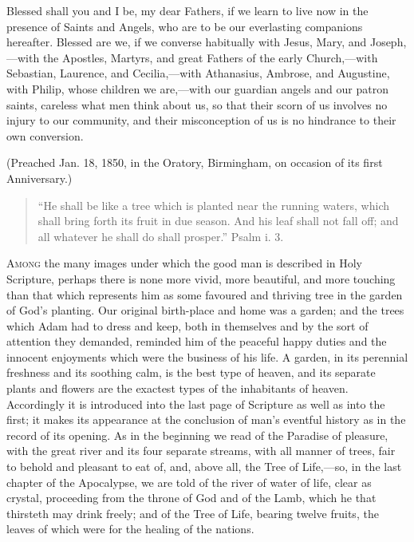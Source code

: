 Blessed shall you and I be, my dear Fathers, if we
learn to live now in the presence of Saints and Angels,
who are to be our everlasting companions hereafter.
Blessed are we, if we converse habitually with Jesus,
Mary, and Joseph,—with the Apostles, Martyrs, and
great Fathers of the early Church,—with Sebastian,
Laurence, and Cecilia,—with Athanasius, Ambrose, and
Augustine, with Philip, whose children we are,—with
our guardian angels and our patron saints, careless what
men think about us, so that their scorn of us involves no
injury to our community, and their misconception of us is
no hindrance to their own conversion.

(Preached Jan. 18, 1850, in the Oratory, Birmingham, on
occasion of its first Anniversary.)


\begin{quote}

``He shall be like a tree which is planted
near the running waters, which shall bring forth its
fruit in due season. And his leaf shall not fall off;
and all whatever he shall do shall prosper.''
Psalm i. 3.

\end{quote}

A\textsc{mong} the many images under which the good man is
described in Holy Scripture, perhaps there is none more
vivid, more beautiful, and more touching than that which
represents him as some favoured and thriving tree in the
garden of God's planting. Our original birth-place and
home was a garden; and the trees which Adam had to dress
and keep, both in themselves and by the sort of attention
they demanded, reminded him of the peaceful happy duties
and the innocent enjoyments which were the business of
his life. A garden, in its perennial freshness and its
soothing calm, is the best type of heaven, and its
separate plants and flowers are the exactest types of the
inhabitants of heaven. Accordingly it is introduced into
the last page of Scripture as well as into the first; it
makes its appearance at the conclusion of man's eventful
history as in the record of its opening. As in the
beginning we read of the Paradise of pleasure, with the
great river and its four separate streams, with all
manner of trees, fair to behold and pleasant to eat of,
and, above all, the Tree of Life,—so, in the last
chapter of the Apocalypse, we are told of the river of
water of life, clear as crystal, proceeding from the
throne of God and of the Lamb, which he that thirsteth
may drink freely; and of the Tree of Life, bearing twelve
fruits, the leaves of which were for the healing of the
nations.

